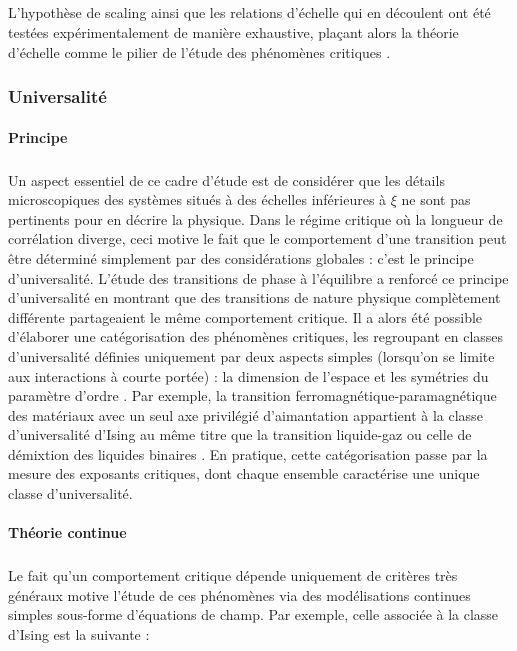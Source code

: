 \subparagraph{}L'hypothèse de scaling ainsi que les relations d'échelle qui en découlent ont été testées expérimentalement de manière exhaustive, plaçant alors la théorie d'échelle comme le pilier de l'étude des phénomènes critiques \cite{lubeck_universal_2004}.

\subsubsection{Universalité}

\label{sec:univcritique}

\paragraph{Principe}

\subparagraph{}Un aspect essentiel de ce cadre d'étude est de considérer que les détails microscopiques des systèmes situés à des échelles inférieures à $\xi$ ne sont pas pertinents pour en décrire la physique. Dans le régime critique où la longueur de corrélation diverge, ceci motive le fait que le comportement d'une transition peut être déterminé simplement par des considérations globales : c'est le principe d'universalité. L'étude des transitions de phase à l'équilibre a renforcé ce principe d'universalité en montrant que des transitions de nature physique complètement différente partageaient le même comportement critique. Il a alors été possible d'élaborer une catégorisation des phénomènes critiques, les regroupant en classes d'universalité définies uniquement par deux aspects simples (lorsqu'on se limite aux interactions à courte portée) : la dimension de l'espace et les symétries du paramètre d'ordre \cite{kardar_statistical_2007}. Par exemple, la transition ferromagnétique-paramagnétique des matériaux avec un seul axe privilégié d'aimantation appartient à la classe d'universalité d'Ising au même titre que la transition liquide-gaz ou celle de démixtion des liquides binaires \cite{lubeck_universal_2004}. En pratique, cette catégorisation passe par la mesure des exposants critiques, dont chaque ensemble caractérise une unique classe d'universalité.

\paragraph{Théorie continue}

\subparagraph{}Le fait qu'un comportement critique dépende uniquement de critères très généraux motive l'étude de ces phénomènes via des modélisations continues simples sous-forme d'équations de champ.  Par exemple, celle associée à la classe d'Ising est la suivante :

